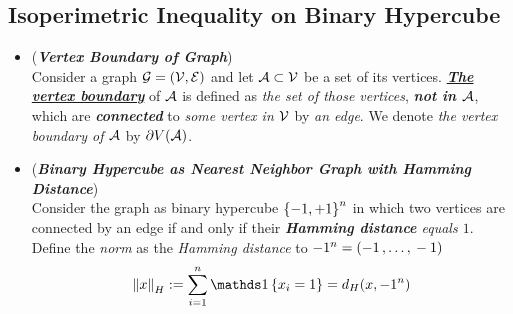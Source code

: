 \documentclass[11pt]{article}
\begin{document}
\subsection{Isoperimetric Inequality on Binary Hypercube}
\begin{itemize}
\item \begin{definition} (\emph{\textbf{Vertex Boundary of Graph}}) \citep{boucheron2013concentration}\\
Consider a graph ${\mathcal G} = ({\mathcal V}, {\mathcal E})$ and let ${\mathcal A} \subset {\mathcal V}$ be a set of its vertices. \underline{\emph{\textbf{The vertex boundary}}} of ${\mathcal A}$ is defined as \emph{the set of those vertices}, \emph{\textbf{not in ${\mathcal A}$}}, which are \emph{\textbf{connected}} to \emph{some vertex in ${\mathcal V}$} by \emph{an edge}. We denote \emph{the vertex boundary of ${\mathcal A}$} by $\partial V({\mathcal A})$.
\end{definition}

\item \begin{remark} (\textbf{\emph{Binary Hypercube as Nearest Neighbor Graph with Hamming Distance}}) \\
Consider the graph as binary hypercube $\left\{-1, +1\right\}^n$ in which two vertices are connected by an edge if and only if their \emph{\textbf{Hamming distance} equals $1$}.  Define the \emph{norm} as the \emph{Hamming distance} to $-1^n= (-1 \,{,}\ldots{,}\, -1)$
\begin{align*}
\norm{x}{H} := \sum_{i=1}^{n}\ind{x_i = 1} = d_{H}(x, -1^n)
\end{align*}
\end{remark}



\end{itemize}
\end{document}
